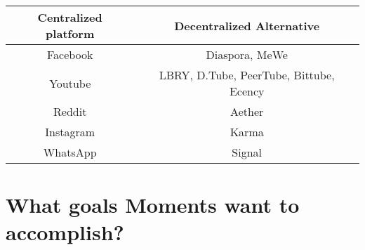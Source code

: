 \documentclass[a4paper]{article}
\begin{document}
    \begin{center}
    \begin{tabular}{|c|c|}
        \hline
        \textbf{Centralized platform} & \textbf{Decentralized Alternative} \\ \hline 
        Facebook &  Diaspora, MeWe\\ \hline
        Youtube & LBRY, D.Tube, PeerTube, Bittube, Ecency \\ \hline
        Reddit & Aether \\ \hline
        Instagram & Karma \\ \hline
        WhatsApp & Signal \\ \hline
    \end{tabular}
    \end{center}

\newpage
\section{What goals Moments want to accomplish?}
\end{document}
